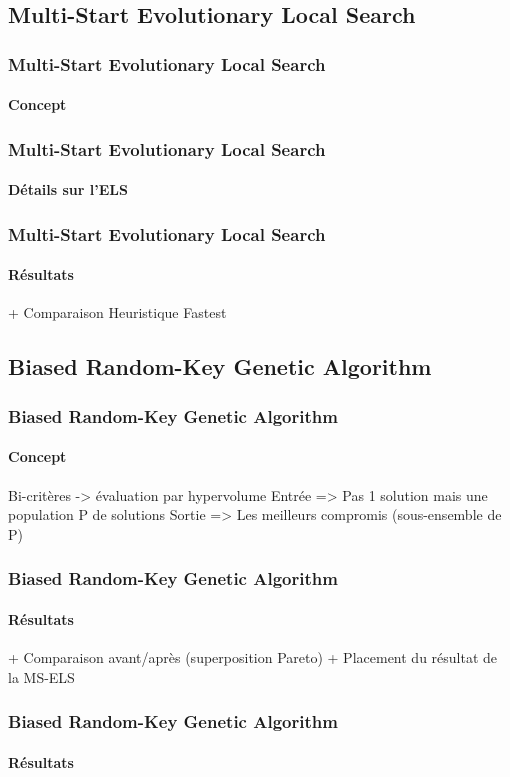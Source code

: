 \subsection{Multi-Start Evolutionary Local Search}
\begin{frame}
	\frametitle{Multi-Start Evolutionary Local Search}
	\framesubtitle{Concept}
\end{frame}
\begin{frame}
	\frametitle{Multi-Start Evolutionary Local Search}
	\framesubtitle{Détails sur l'ELS}
	\begin{tikzpicture}[scale=.5,transform shape,node distance=1cm]
		
	\end{tikzpicture}
\end{frame}
\begin{frame}
	\frametitle{Multi-Start Evolutionary Local Search}
	\framesubtitle{Résultats}
	+ Comparaison Heuristique Fastest
\end{frame}

\subsection{Biased Random-Key Genetic Algorithm}
\begin{frame}
	\frametitle{Biased Random-Key Genetic Algorithm}
	\framesubtitle{Concept}
	Bi-critères -> évaluation par hypervolume
	Entrée => Pas 1 solution mais une population P de solutions
	Sortie => Les meilleurs compromis (sous-ensemble de P)
\end{frame}
\begin{frame}
	\frametitle{Biased Random-Key Genetic Algorithm}
	\framesubtitle{Résultats}
	+ Comparaison avant/après (superposition Pareto)
	+ Placement du résultat de la MS-ELS
\end{frame}
\begin{frame}
	\frametitle{Biased Random-Key Genetic Algorithm}
	\framesubtitle{Résultats}
	
\end{frame}
